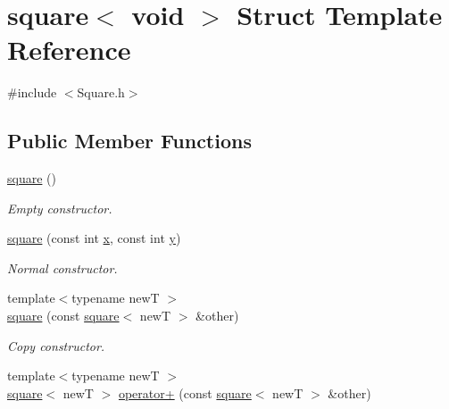 \hypertarget{structsquare_3_01void_01_4}{}\section{square$<$ void $>$ Struct Template Reference}
\label{structsquare_3_01void_01_4}


{\ttfamily \#include $<$Square.\+h$>$}

\subsection*{Public Member Functions}
\begin{DoxyCompactItemize}
\item 
\hyperlink{structsquare_3_01void_01_4_a9ba4bc7062257af4dc7bc68d91afc8dd}{square} ()\hypertarget{structsquare_3_01void_01_4_a9ba4bc7062257af4dc7bc68d91afc8dd}{}\label{structsquare_3_01void_01_4_a9ba4bc7062257af4dc7bc68d91afc8dd}

\begin{DoxyCompactList}\small\item\em Empty constructor. \end{DoxyCompactList}\item 
\hyperlink{structsquare_3_01void_01_4_acad0604c4c01934956f9e547b61963bd}{square} (const int \hyperlink{structsquare_3_01void_01_4_a1b2185b1eacd68916a02287c21916a25}{x}, const int \hyperlink{structsquare_3_01void_01_4_a2f5565ddd32970d151f1973db2fc3881}{y})\hypertarget{structsquare_3_01void_01_4_acad0604c4c01934956f9e547b61963bd}{}\label{structsquare_3_01void_01_4_acad0604c4c01934956f9e547b61963bd}

\begin{DoxyCompactList}\small\item\em Normal constructor. \end{DoxyCompactList}\item 
{\footnotesize template$<$typename newT $>$ }\\\hyperlink{structsquare_3_01void_01_4_a3144b85567ed10bfc6ecc5cafbe4e4ac}{square} (const \hyperlink{structsquare}{square}$<$ newT $>$ \&other)\hypertarget{structsquare_3_01void_01_4_a3144b85567ed10bfc6ecc5cafbe4e4ac}{}\label{structsquare_3_01void_01_4_a3144b85567ed10bfc6ecc5cafbe4e4ac}

\begin{DoxyCompactList}\small\item\em Copy constructor. \end{DoxyCompactList}\item 
{\footnotesize template$<$typename newT $>$ }\\\hyperlink{structsquare}{square}$<$ newT $>$ \hyperlink{structsquare_3_01void_01_4_ab7ae9a220b3d4aa3afce1873c25558eb}{operator+} (const \hyperlink{structsquare}{square}$<$ newT $>$ \&other)\hypertarget{structsquare_3_01void_01_4_ab7ae9a220b3d4aa3afce1873c25558eb}{}\label{structsquare_3_01void_01_4_ab7ae9a220b3d4aa3afce1873c25558eb}


\end{DoxyCompactItemize}
